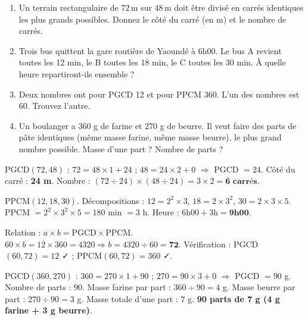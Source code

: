\documentclass[11pt]{article}
\begin{document}
\begin{exercice}
\begin{enumerate}
\item Un terrain rectangulaire de $72\,\text{m}$ sur $48\,\text{m}$ doit être divisé en carrés identiques les plus grands possibles. Donnez le côté du carré (en m) et le nombre de carrés.
\item Trois bus quittent la gare routière de Yaoundé à 6h00. Le bus A revient toutes les 12 min, le B toutes les 18 min, le C toutes les 30 min. À quelle heure repartiront-ils ensemble ?
\item Deux nombres ont pour PGCD 12 et pour PPCM 360. L'un des nombres est 60. Trouvez l'autre.
\item Un boulanger a 360 g de farine et 270 g de beurre. Il veut faire des parts de pâte identiques (même masse farine, même masse beurre), le plus grand nombre possible. Masse d'une part ? Nombre de parts ?
\end{enumerate}
\end{exercice}

\begin{corrige}[Exercice 1]
PGCD$(72,48)$ : $72=48\times1+24$ ; $48=24\times2+0$ $\Rightarrow$ PGCD $=24$.
Côté du carré : \textbf{24 m}. Nombre : $(72\div24)\times(48\div24)=3\times2=\textbf{6 carrés}$.
\end{corrige}

\begin{corrige}[Exercice 2]
PPCM$(12,18,30)$. Décompositions : $12=2^2\times3$, $18=2\times3^2$, $30=2\times3\times5$.
PPCM $=2^2\times3^2\times5=180$ min $=3$ h.
Heure : $6\text{h}00 + 3\text{h} = \textbf{9h00}$.
\end{corrige}

\begin{corrige}[Exercice 3]
Relation : $a\times b = \text{PGCD}\times\text{PPCM}$.
$60 \times b = 12 \times 360 = 4320 \Rightarrow b = 4320 \div 60 = \textbf{72}$.
Vérification : PGCD$(60,72)=12$ ✓ ; PPCM$(60,72)=360$ ✓.
\end{corrige}

\begin{corrige}[Exercice 4]
PGCD$(360,270)$ : $360=270\times1+90$ ; $270=90\times3+0$ $\Rightarrow$ PGCD $=90$ g.
Nombre de parts : $90$.
Masse farine par part : $360\div90=4$ g.
Masse beurre par part : $270\div90=3$ g.
Masse totale d'une part : $7$ g.
\textbf{90 parts de 7 g (4 g farine + 3 g beurre)}.
\end{corrige}
\end{document}
